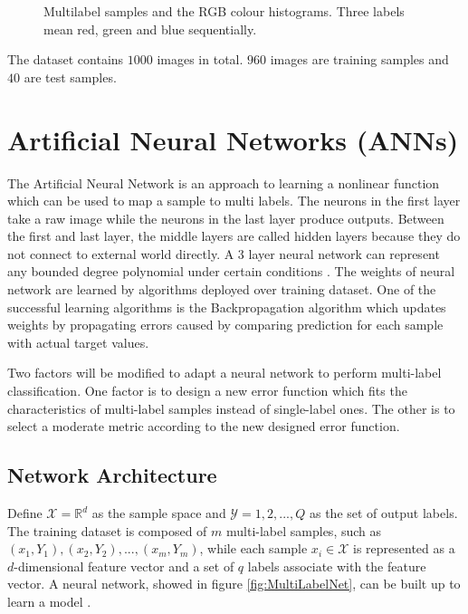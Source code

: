 \begin{figure}[!htb]
\caption{Multilabel samples and the RGB colour histograms. Three labels mean red, green and blue sequentially. }
\end{figure}

The dataset contains $1000$ images in total. $960$ images are training samples and $40$ are test samples. 

\section{Artificial Neural Networks (ANNs)}

The Artificial Neural Network is an approach to learning a nonlinear function which can be used to map a sample to multi labels. The neurons in the first layer take a raw image while the neurons in the last layer produce outputs. Between the first and last layer, the middle layers are called hidden layers because they do not connect to external world directly. A 3 layer neural network can represent any bounded degree polynomial under certain conditions \citep{barron1993universal}. The weights of neural network are learned by algorithms deployed over training dataset. One of the successful learning algorithms is the Backpropagation algorithm which updates weights by propagating errors caused by comparing prediction for each sample with actual target values.

Two factors will be modified to adapt a neural network to perform multi-label classification. One factor is to design a new error function which fits the characteristics of multi-label samples instead of single-label ones. The other is to select a moderate metric according to the new designed error function.

\subsection{Network Architecture}

Define $\mathcal{X} = \mathbb{R}^{d}$ as the sample space and $\mathcal{Y} = {1,2,...,Q}$ as the set of output labels. The training dataset is composed of $m$ multi-label samples, such as ${(x_{1}, Y_{1}),(x_{2}, Y_{2}),...,(x_{m}, Y_{m})}$, while each sample $x_{i} \in \mathcal{X}$ is represented as a $d$-dimensional feature vector and a set of $q$ labels associate with the feature vector. A neural network, showed in figure \ref{fig:MultiLabelNet}, can be built up to learn a model .

